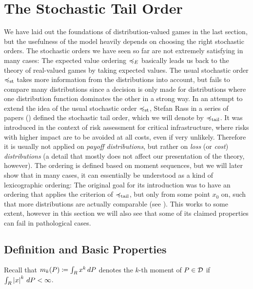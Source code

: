 \documentclass[a4paper]{scrreprt}
\newcommand{\M}{M}
\theoremstyle{definition}
\newtheorem{defn}[thm]{Definition} %
\begin{document}
    \section{The Stochastic Tail Order}
    We have laid out the foundations of distribution-valued games in the last section, but the usefulness of the model heavily depends on choosing the right stochastic orders.
    The stochastic orders we have seen so far are not extremely satisfying in many cases: The expected value ordering $\preccurlyeq_E$ basically leads us back to the theory of real-valued games by taking expected values. The usual stochastic order $\preccurlyeq_{\text{st}}$ takes more information from the distributions into account, but fails to compare many distributions since a decision is only made for distributions where one distribution function dominates the other in a strong way.
    In an attempt to extend the idea of the usual stochastic order $\preccurlyeq_{\text{st}}$, Stefan Rass in a series of papers (\cite{bib:rassGameRiskManagI,bib:rassGameRiskManagII,bib:rassTotalOrderingOnLossDistributions}) defined the stochastic tail order, which we will denote by $\preccurlyeq_{\text{tail}}$.
    It was introduced in the context of risk assessment for critical infrastructure, where risks with higher impact are to  be avoided at all costs, even if very unlikely.
    Therefore it is usually not applied on \emph{payoff distributions}, but rather on \emph{loss} (or \emph{cost}) \emph{distributions} (a detail that mostly does not affect our presentation of the theory, however).
    The ordering is defined based on moment sequences, but we will later show that in many cases, it can essentially be understood as a kind of lexicographic ordering: The original goal for its introduction was to have an ordering that applies the criterion of $\preccurlyeq_{\text{tail}}$, but only from some point $x_0$ on, such that more distributions are actually comparable (see \cite{bib:rassTotalOrderingOnLossDistributions}). This works to some extent, however in this section we will also see that some of its claimed properties can fail in pathological cases.

    \subsection{Definition and Basic Properties}
    Recall that $m_k(P) \coloneqq \int_{R} x^k \, dP$ denotes the $k$-th moment of $P \in \mathcal{D}$ if $\int_{R} \left| x \right|^k \, dP < \infty$.
\end{document}

